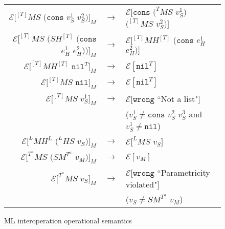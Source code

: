 \begin{figure}[p]
\begin{tabular}{rcl}
$\mathscr{E}[^{[T]}MS$ $(\mathtt{cons}$ $v_{S}^{1}$ $v_{S}^{2})]_{M}$ & $\rightarrow$ & $\mathscr{E}[\mathtt{cons}$ $(^{T}MS$ $v_{S}^{1})$ $(^{[T]}MS$ $v_{S}^{2})]$ \\
$\mathscr{E}[^{[T]}MS$ $(SH^{[T]}$ $(\mathtt{cons}$ $e_{H}^{1}$ $e_{H}^{2}))]_{M}$ & $\rightarrow$ & $\mathscr{E}[^{[T]}MH^{[T]}$ $(\mathtt{cons}$ $e_{H}^{1}$ $e_{H}^{2})]$ \\
$\mathscr{E}[^{[T]}MH^{[T]}$ $\mathtt{nil}^{T}]_{M}$ & $\rightarrow$ & $\mathscr{E}[\mathtt{nil}^{T}]$ \\
$\mathscr{E}[^{[T]}MS$ $\mathtt{nil}]_{M}$ & $\rightarrow$ & $\mathscr{E}[\mathtt{nil}^{T}]$ \\
$\mathscr{E}[^{[T]}MS$ $v_{S}^{1}]_{M}$ & $\rightarrow$ & $\mathscr{E}[\mathtt{wrong}$ ``Not a list"$]$ \\
&& ($v_{S}^{1}\neq\mathtt{cons}$ $v_{S}^{2}$ $v_{S}^{3}$ and $v_{S}^{1}\neq\mathtt{nil}$) \\
$\mathscr{E}[^{L}MH^{L}$ $(^{L}HS$ $v_{S})]_{M}$ & $\rightarrow$ & $\mathscr{E}[^{L}MS$ $v_{S}]$ \\
$\mathscr{E}[^{T^{a}}MS$ $(SM^{T^{a}}$ $v_{M})]_{M}$ & $\rightarrow$ & $\mathscr{E}[v_{M}]$ \\
$\mathscr{E}[^{T^{a}}MS$ $v_{S}]_{M}$ & $\rightarrow$ & $\mathscr{E}[\mathtt{wrong}$ ``Parametricity violated"$]$ \\
&& ($v_{S}\neq SM^{T^{a}}$ $v_{M}$)
\end{tabular}
\caption{ML interoperation operational semantics}
\label{mios}
\end{figure}
